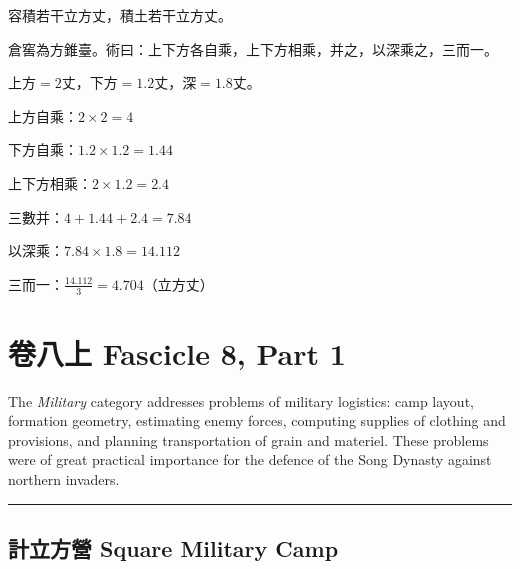 \documentclass[11pt,a4paper]{article}
\newcommand{\longline}{\noindent\rule{\textwidth}{0.4pt}}
\begin{document}
\begin{answer}
容積若干立方丈，積土若干立方丈。
\end{answer}

\begin{method}
倉窖為方錐臺。術曰：上下方各自乘，上下方相乘，并之，以深乘之，三而一。
\end{method}

\begin{working}
上方$=2$丈，下方$=1.2$丈，深$=1.8$丈。

上方自乘：$2 \times 2 = 4$

下方自乘：$1.2 \times 1.2 = 1.44$

上下方相乘：$2 \times 1.2 = 2.4$

三數并：$4 + 1.44 + 2.4 = 7.84$

以深乘：$7.84 \times 1.8 = 14.112$

三而一：$\displaystyle\frac{14.112}{3} = 4.704$（立方丈）
\end{working}

\newpage

\section{卷八上 \quad Fascicle 8, Part 1}
\label{sec:fasc8a}

\begin{center}
\end{center}

\medskip

\noindent The \textit{Military} category addresses problems of military logistics: camp layout, formation geometry, estimating enemy forces, computing supplies of clothing and provisions, and planning transportation of grain and materiel. These problems were of great practical importance for the defence of the Song Dynasty against northern invaders.

\vspace{0.8em}
\longline

\subsection{計立方營 \quad Square Military Camp}
\end{document}
